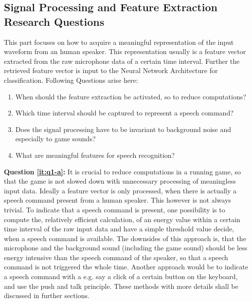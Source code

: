 \subsection{Signal Processing and Feature Extraction Research Questions}
This part focuses on how to acquire a meaningful representation of the input waveform from an human speaker. This representation usually is a feature vector extracted from the raw microphone data of a certain time interval. Further the retrieved feature vector is input to the Neural Network Architecture for classification. Following Questions arise here:

\begin{enumerate}[label={Q.1.\alph*)}, leftmargin=1.75cm]
    \item When should the feature extraction be activated, so to reduce computations?
    
    \label{it:q1-a}
    
    \item Which time interval should be captured to represent a speech command?
    \label{it:q1-b}
    
    \item Does the signal processing have to be invariant to background noise and especially to game sounds?
    \label{it:q1-c}
    
    \item What are meaningful features for speech recognition?
    \label{it:q1-d}
    
\end{enumerate}
\noindent
\textbf{Question \ref{it:q1-a}:} 
It is crucial to reduce computations in a running game, so that the game is not slowed down with unnecessary processing of meaningless input data.
Ideally a feature vector is only processed, when there is actually a speech command present from a human speaker. 
This however is not always trivial.
To indicate that a speech command is present, one possibility is to compute the, relatively efficient calculation, of an energy value within a certain time interval of the raw input data and have a simple threshold value decide, when a speech command is available. 
The downsides of this approach is, that the microphone and the background sound (including the game sound) should be less energy intensive than the speech command of the speaker, so that a speech command is not triggered the whole time.
Another approach would be to indicate a speech command with a e.g. say a click of a certain button on the keyboard, and use the push and talk principle. 
These methods with more details shall be discussed in further sections.


